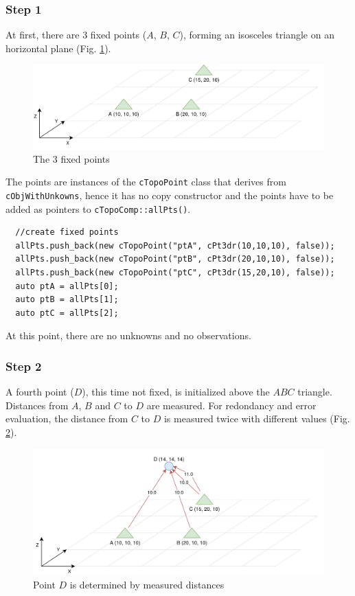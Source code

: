 \subsubsection{Step 1}

At first, there are 3 fixed points ($A$, $B$, $C$), forming an isosceles triangle
on an horizontal plane (Fig. \ref{fig:topoEx1}).

\begin{figure}[!h]
\centering
\includegraphics[width=12cm]{Programmer/benchtopo1.png}
\caption{The 3 fixed points}
\label{fig:topoEx1}
\end{figure}

The points are instances of the \texttt{cTopoPoint} class that
derives from \texttt{cObjWithUnkowns}, hence it has no copy constructor and
the points have to be added as pointers to \texttt{cTopoComp::allPts()}.

\begin{lstlisting}
  //create fixed points
  allPts.push_back(new cTopoPoint("ptA", cPt3dr(10,10,10), false));
  allPts.push_back(new cTopoPoint("ptB", cPt3dr(20,10,10), false));
  allPts.push_back(new cTopoPoint("ptC", cPt3dr(15,20,10), false));
  auto ptA = allPts[0];
  auto ptB = allPts[1];
  auto ptC = allPts[2];
\end{lstlisting}

At this point, there are no unknowns and no observations.


\subsubsection{Step 2}

A fourth point ($D$), this time not fixed, is initialized above the $ABC$ triangle.
Distances from $A$, $B$ and $C$ to $D$
are measured. For redondancy and error evaluation, the distance from $C$ to $D$ is measured twice
with different values (Fig. \ref{fig:topoEx2}).

\begin{figure}[!h]
\centering
\includegraphics[width=12cm]{Programmer/benchtopo2.png}
\caption{Point $D$ is determined by measured distances}
\label{fig:topoEx2}
\end{figure}

